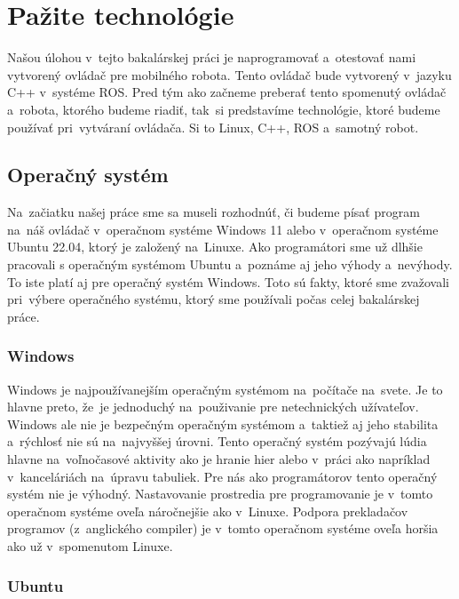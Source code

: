 \section{Pažite technológie}
\label{sec:technologies}

Našou úlohou v~tejto bakalárskej práci je naprogramovať a~otestovať nami vytvorený ovládač pre mobilného robota. Tento ovládač
bude vytvorený v~jazyku C++ v~systéme ROS. Pred tým ako začneme preberať tento spomenutý ovládač a~robota, ktorého budeme riadiť,
tak~si predstavíme technológie, ktoré budeme používať pri~vytváraní ovládača. Si to Linux, C++, ROS a~samotný robot.

\subsection{Operačný systém}
\label{sec:operating_system}

Na~začiatku našej práce sme sa museli rozhodnúť, či budeme písať program na~náš ovládač v~operačnom systéme Windows 11 alebo
v~operačnom systéme Ubuntu 22.04, ktorý je založený na~Linuxe. Ako programátori sme už dlhšie pracovali s operačným systémom
Ubuntu a~poznáme aj jeho výhody a~nevýhody. To iste platí aj pre operačný systém Windows. Toto sú fakty, ktoré sme zvažovali
pri~výbere operačného systému, ktorý sme používali počas celej bakalárskej práce.

\subsubsection{Windows}
\label{sec:windows}

Windows je najpoužívanejším operačným systémom na~počítače na~svete. Je to hlavne preto, že~je jednoduchý na~použivanie
pre netechnických užívateľov. Windows ale nie je bezpečným operačným systémom a~taktiež aj jeho stabilita a~rýchlosť
nie sú na~najvyššej úrovni. Tento operačný systém pozývajú lúdia hlavne na~voľnočasové aktivity ako je hranie hier
alebo v~práci ako napríklad v~kanceláriách na~úpravu tabuliek. Pre nás ako programátorov tento operačný systém nie je
výhodný. Nastavovanie prostredia pre programovanie je v~tomto operačnom systéme oveľa náročnejšie ako v~Linuxe. Podpora
prekladačov programov (z~anglického compiler) je v~tomto operačnom systéme oveľa horšia ako už v~spomenutom Linuxe.

\subsubsection{Ubuntu}
\label{sec:ubuntu}

